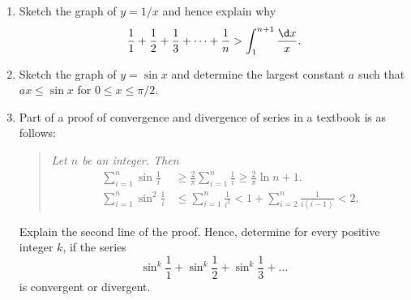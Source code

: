 \begin{problem}
    \begin{enumerate}
        \item Sketch the graph of $y = 1/x$ and hence explain why \[\frac11 + \frac12 + \frac13 + \dots + \frac1n > \int_{1}^{n+1} \frac{\d x}{x}.\]
        \item Sketch the graph of $y = \sin x$ and determine the largest constant $a$ such that $ax \leq \sin x$ for $0 \leq x \leq \pi/2$.
        \item Part of a proof of convergence and divergence of series in a textbook is as follows:
        \begin{quote}\itshape
            Let $n$ be an integer. Then
            \begin{align*}
                \sum_{i = 1}^n \sin \frac1i &\geq \frac2\pi \sum_{i = 1}^n \frac1i \geq \frac2\pi \ln{n+1}.\\
                \sum_{i = 1}^n \sin^2 \frac1i &\leq \sum_{i = 1}^n \frac1{i^2} < 1 + \sum_{i = 2}^n \frac1{i(i-1)} < 2.
            \end{align*}
        \end{quote}
        Explain the second line of the proof. Hence, determine for every positive integer $k$, if the series \[\sin^k \frac11 + \sin^k \frac12 + \sin^k \frac13 + \dots\] is convergent or divergent.
    \end{enumerate}
\end{problem}
